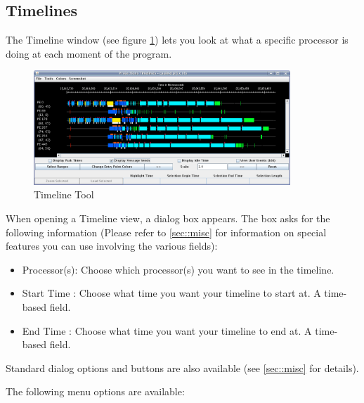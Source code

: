 \documentclass[10pt]{report}
\begin{document}
\subsection{Timelines}
\label{sec::timeline view}


The Timeline window (see figure \ref{timeline}) lets you look at what
a specific processor is doing at each moment of the program.

\begin{figure}[htb]
\center
\includegraphics[width=3.8in]{fig/timeline}
\caption{Timeline Tool}
\label{timeline}
\end{figure}


When opening a Timeline view, a dialog box appears. 
The box asks for the following information (Please refer to
\ref{sec::misc} for information on special features you can
use involving the various fields):

\begin{itemize}
\item
Processor(s): Choose which processor(s) you want to see in the timeline.
\item
Start Time  : Choose what time you want your timeline to start at.
A time-based field.
\item
End Time    : Choose what time you want your timeline to end at. A time-based
field.
\end{itemize}

Standard \projections{} dialog options and buttons are also available
(see \ref{sec::misc} for details).


The following menu options are available:
\end{document}
